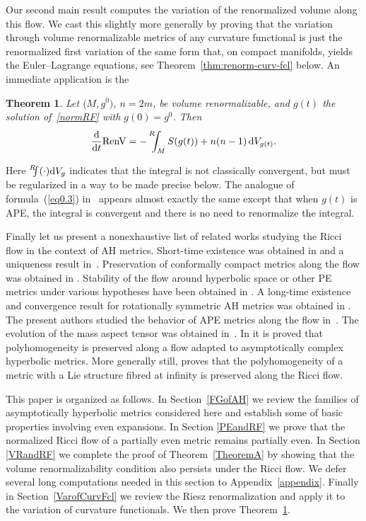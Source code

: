 \documentclass[pdftex]{sigma}
\numberwithin{equation}{section}
\newtheorem{Theorem}{Theorem}[section]
\newcommand{\RenV}{\mathrm{RenV}}
\newcommand{\gin}{{g^0}}
\newcommand{\Renint}{\mathop{\vphantom{T}}^R \! \! \! \int}
\begin{document}
Our second main result computes the variation of the renormalized volume along this flow. We cast this slightly more generally
by proving that the variation through volume renormalizable metrics of any curvature functional is just the renormalized first
variation of the same form that, on compact manifolds, yields the Euler--Lagrange equations, see Theorem~\ref{thm:renorm-curv-fcl} below.
An immediate application is the
\begin{Theorem} \label{TheoremB}
Let $\big(M,\gin\big)$, $n = 2m$, be volume renormalizable, and $g(t)$ the solution of~\eqref{normRF} with $g(0) = \gin$. Then
\begin{gather}\label{eq0.3}
\frac{{\rm d}}{{\rm d}t} \RenV = - \Renint_M S(g(t)) + n(n-1) \, {\rm d}V_{g(t)} .
\end{gather}
\end{Theorem}
Here $\Renint (\cdot) {\rm d}V_{g}$ indicates that the integral is not classically convergent, but must be regularized in a way to be
made precise below. The analogue of formula~(\ref{eq0.3}) in~\cite{BMW} appears almost exactly the same except that when
$g(t)$ is APE, the integral is convergent and there is no need to renormalize the integral.

Finally let us present a nonexhaustive list of related works studying the Ricci flow in the context of AH metrics.
Short-time existence was obtained in \cite{WXShi} and a uniqueness result in~\cite{Chen-Zhu}. Preservation of
conformally compact metrics along the flow was obtained in \cite{Bahuaud}. Stability of the flow around hyperbolic space
or other PE metrics under various hypotheses have been obtained in \cite{Bamler,QSW,SSS}. A long-time existence and
convergence result for rotationally symmetric AH metrics was obtained in \cite{BahuaudWoolgar}. The present authors
studied the behavior of APE metrics along the flow in~\cite{BMW}. The evolution of the mass aspect tensor was obtained in~\cite{BW}. In \cite{R} it is proved that polyhomogeneity is preserved along a flow adapted to asymptotically complex hyperbolic metrics. More generally still, \cite{Ammar} proves that the polyhomogeneity of a metric with a Lie structure fibred at infinity is preserved along the Ricci flow.

This paper is organized as follows. In Section~\ref{FGofAH} we review the families of asymptotically hyperbolic metrics
considered here and establish some of basic properties involving even expansions. In Section \ref{PEandRF} we prove that
the normalized Ricci flow of a partially even metric remains partially even. In Section \ref{VRandRF} we complete the proof
of Theorem~\ref{TheoremA} by showing that the volume renormalizability condition also persists under the Ricci flow. We
defer several long computations needed in this section to Appendix~\ref{appendix}. Finally in Section~\ref{VarofCurvFcl} we review the
Riesz renormalization and apply it to the variation of curvature functionals. We then prove Theorem~\ref{TheoremB}.
\end{document}
